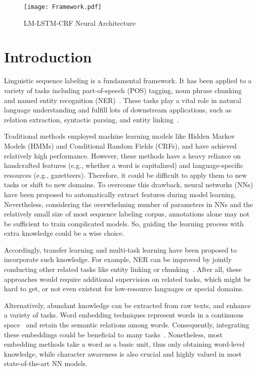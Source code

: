 \documentclass[letterpaper]{article} \usepackage{aaai18}  \usepackage{times}  \usepackage{helvet}  \usepackage{courier}  \usepackage{url}  \usepackage{graphicx}  \usepackage{multirow}
\newcommand{\our}{\textsc{LM-LSTM-CRF}\xspace}
\newcommand{\saft}{}
\begin{document}
\begin{figure*}[ht!]
  \centering
    \texttt{[image: Framework.pdf]}
  \caption{\our Neural Architecture}
  \label{fig:Framework}
\saft
\end{figure*}


\section{Introduction}
\label{sect:intro}

Linguistic sequence labeling is a fundamental framework.
It has been applied to a variety of tasks including part-of-speech (POS) tagging, noun phrase chunking and named entity recognition (NER)~\cite{ma-hovy:2016:P16-1,sha2003shallow}.
These tasks play a vital role in natural language understanding and fulfill lots of downstream applications, such as relation extraction, syntactic parsing, and entity linking~\cite{2017arXiv170700166L,luo2015joint}.

Traditional methods employed machine learning models like Hidden Markov Models (HMMs) and Conditional Random Fields (CRFs), and have achieved relatively high performance.
However, these methods have a heavy reliance on handcrafted features (e.g., whether a word is capitalized) and language-specific resources (e.g., gazetteers).
Therefore, it could be difficult to apply them to new tasks or shift to new domains.
To overcome this drawback, neural networks (NNs) have been proposed to automatically extract features during model learning.
Nevertheless, considering the overwhelming number of parameters in NNs and the relatively small size of most sequence labeling corpus, annotations alone may not be sufficient to train complicated models.
So, guiding the learning process with extra knowledge could be a wise choice.

Accordingly, transfer learning and multi-task learning have been proposed to incorporate such knowledge.
For example, NER can be improved by jointly conducting other related tasks like entity linking or chunking~\cite{luo2015joint,peng2016improving}.
After all, these approaches would require additional supervision on related tasks, which might be hard to get, or not even existent for low-resource languages or special domains.

Alternatively, abundant knowledge can be extracted from raw texts, and enhance a variety of tasks.
Word embedding techniques represent words in a continuous space~\cite{mikolov2013distributed,pennington2014glove} and retain the semantic relations among words.
Consequently, integrating these embeddings 
could be beneficial to many tasks~\cite{2017arXiv170700166L,2016naacl}.
Nonetheless, most embedding methods take a word as a basic unit, thus only obtaining word-level knowledge, while character awareness is also crucial and highly valued in most state-of-the-art NN models.
\end{document}

